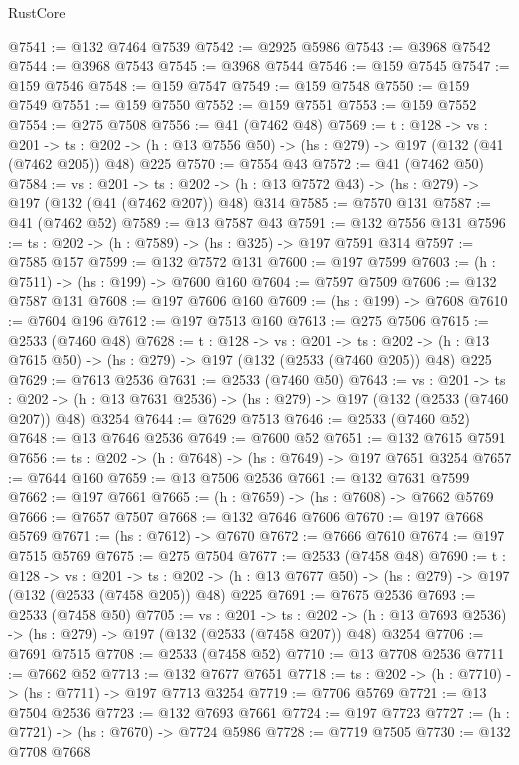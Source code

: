 \begin{lexlean}{RustCore}
\begin{coremodule}
@7541 := @132 @7464 @7539
@7542 := @2925 @5986
@7543 := @3968 @7542
@7544 := @3968 @7543
@7545 := @3968 @7544
@7546 := @159 @7545
@7547 := @159 @7546
@7548 := @159 @7547
@7549 := @159 @7548
@7550 := @159 @7549
@7551 := @159 @7550
@7552 := @159 @7551
@7553 := @159 @7552
@7554 := @275 @7508
@7556 := @41 (@7462 @48)
@7569 := {t : @128} ->
  {vs : @201} ->
  {ts : @202} -> (h : @13 @7556 @50) -> (hs : @279) -> @197 (@132 (@41 (@7462 @205)) @48) @225
@7570 := @7554 @43
@7572 := @41 (@7462 @50)
@7584 := {vs : @201} ->
  {ts : @202} -> (h : @13 @7572 @43) -> (hs : @279) -> @197 (@132 (@41 (@7462 @207)) @48) @314
@7585 := @7570 @131
@7587 := @41 (@7462 @52)
@7589 := @13 @7587 @43
@7591 := @132 @7556 @131
@7596 := {ts : @202} -> (h : @7589) -> (hs : @325) -> @197 @7591 @314
@7597 := @7585 @157
@7599 := @132 @7572 @131
@7600 := @197 @7599
@7603 := (h : @7511) -> (hs : @199) -> @7600 @160
@7604 := @7597 @7509
@7606 := @132 @7587 @131
@7608 := @197 @7606 @160
@7609 := (hs : @199) -> @7608
@7610 := @7604 @196
@7612 := @197 @7513 @160
@7613 := @275 @7506
@7615 := @2533 (@7460 @48)
@7628 := {t : @128} ->
  {vs : @201} ->
  {ts : @202} -> (h : @13 @7615 @50) -> (hs : @279) -> @197 (@132 (@2533 (@7460 @205)) @48) @225
@7629 := @7613 @2536
@7631 := @2533 (@7460 @50)
@7643 := {vs : @201} ->
  {ts : @202} -> (h : @13 @7631 @2536) -> (hs : @279) -> @197 (@132 (@2533 (@7460 @207)) @48) @3254
@7644 := @7629 @7513
@7646 := @2533 (@7460 @52)
@7648 := @13 @7646 @2536
@7649 := @7600 @52
@7651 := @132 @7615 @7591
@7656 := {ts : @202} -> (h : @7648) -> (hs : @7649) -> @197 @7651 @3254
@7657 := @7644 @160
@7659 := @13 @7506 @2536
@7661 := @132 @7631 @7599
@7662 := @197 @7661
@7665 := (h : @7659) -> (hs : @7608) -> @7662 @5769
@7666 := @7657 @7507
@7668 := @132 @7646 @7606
@7670 := @197 @7668 @5769
@7671 := (hs : @7612) -> @7670
@7672 := @7666 @7610
@7674 := @197 @7515 @5769
@7675 := @275 @7504
@7677 := @2533 (@7458 @48)
@7690 := {t : @128} ->
  {vs : @201} ->
  {ts : @202} -> (h : @13 @7677 @50) -> (hs : @279) -> @197 (@132 (@2533 (@7458 @205)) @48) @225
@7691 := @7675 @2536
@7693 := @2533 (@7458 @50)
@7705 := {vs : @201} ->
  {ts : @202} -> (h : @13 @7693 @2536) -> (hs : @279) -> @197 (@132 (@2533 (@7458 @207)) @48) @3254
@7706 := @7691 @7515
@7708 := @2533 (@7458 @52)
@7710 := @13 @7708 @2536
@7711 := @7662 @52
@7713 := @132 @7677 @7651
@7718 := {ts : @202} -> (h : @7710) -> (hs : @7711) -> @197 @7713 @3254
@7719 := @7706 @5769
@7721 := @13 @7504 @2536
@7723 := @132 @7693 @7661
@7724 := @197 @7723
@7727 := (h : @7721) -> (hs : @7670) -> @7724 @5986
@7728 := @7719 @7505
@7730 := @132 @7708 @7668

\end{coremodule}
\end{lexlean}
